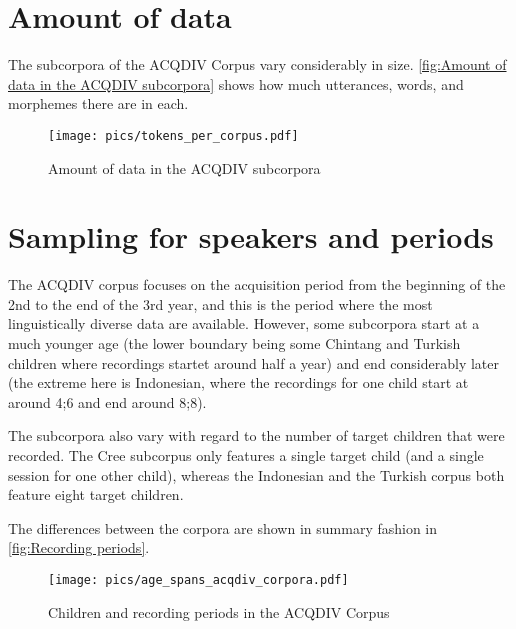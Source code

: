 \documentclass[a4paper, 11pt]{book}
\begin{document}
%

\newpage

\section{Amount of data}
\label{sec:Amount of data}

The subcorpora of the ACQDIV Corpus vary considerably in size. \autoref{fig:Amount of data in the ACQDIV subcorpora} shows how much utterances, words, and morphemes there are in each. 

\begin{figure}[ht!]
	\centering
	\texttt{[image: pics/tokens\_per\_corpus.pdf]}
	\caption{Amount of data in the ACQDIV subcorpora}
	\label{fig:Amount of data in the ACQDIV subcorpora}
\end{figure}

\section{Sampling for speakers and periods}
\label{sec:Sampling for speakers and periods}

The ACQDIV corpus focuses on the acquisition period from the beginning of the 2nd to the end of the 3rd year, and this is the period where the most linguistically diverse data are available. However, some subcorpora start at a much younger age (the lower boundary being some Chintang and Turkish children where recordings startet around half a year) and end considerably later (the extreme here is Indonesian, where the recordings for one child start at around 4;6 and end around 8;8). 

The subcorpora also vary with regard to the number of target children that were recorded. The Cree subcorpus only features a single target child (and a single session for one other child), whereas the Indonesian and the Turkish corpus both feature eight target children. 

The differences between the corpora are shown in summary fashion in \autoref{fig:Recording periods}. 

\begin{figure}
	\centering
	\texttt{[image: pics/age\_spans\_acqdiv\_corpora.pdf]}
	\caption{Children and recording periods in the ACQDIV Corpus}
	\label{fig:Recording periods}
\end{figure}
\end{document}
